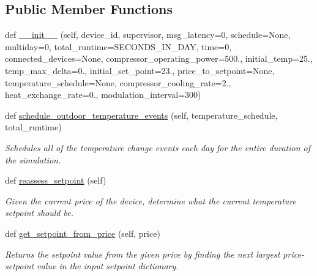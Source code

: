 \subsection*{Public Member Functions}
\begin{DoxyCompactItemize}
\item 
def \hyperlink{class_build_1_1_objects_1_1air__conditioner_1_1_air_conditioner_simple_a851cc811958a860f2796cbb5af4f40da}{\+\_\+\+\_\+init\+\_\+\+\_\+} (self, device\+\_\+id, supervisor, msg\+\_\+latency=0, schedule=None, multiday=0, total\+\_\+runtime=S\+E\+C\+O\+N\+D\+S\+\_\+\+I\+N\+\_\+\+D\+AY, time=0, connected\+\_\+devices=None, compressor\+\_\+operating\+\_\+power=500., initial\+\_\+temp=25., temp\+\_\+max\+\_\+delta=0., initial\+\_\+set\+\_\+point=23., price\+\_\+to\+\_\+setpoint=None, temperature\+\_\+schedule=None, compressor\+\_\+cooling\+\_\+rate=2., heat\+\_\+exchange\+\_\+rate=0., modulation\+\_\+interval=300)
\item 
def \hyperlink{class_build_1_1_objects_1_1air__conditioner_1_1_air_conditioner_simple_a780672ba57c94495b1203d5da8715ec8}{schedule\+\_\+outdoor\+\_\+temperature\+\_\+events} (self, temperature\+\_\+schedule, total\+\_\+runtime)
\begin{DoxyCompactList}\small\item\em Schedules all of the temperature change events each day for the entire duration of the simulation. \end{DoxyCompactList}\item 
def \hyperlink{class_build_1_1_objects_1_1air__conditioner_1_1_air_conditioner_simple_ace754a3c9581817b5bbce2394da2163a}{reassess\+\_\+setpoint} (self)
\begin{DoxyCompactList}\small\item\em Given the current price of the device, determine what the current temperature setpoint should be. \end{DoxyCompactList}\item 
def \hyperlink{class_build_1_1_objects_1_1air__conditioner_1_1_air_conditioner_simple_ac637b8d11556eea36880d3947b5c00c0}{get\+\_\+setpoint\+\_\+from\+\_\+price} (self, price)
\begin{DoxyCompactList}\small\item\em Returns the setpoint value from the given price by finding the next largest price-\/setpoint value in the input setpoint dictionary. \end{DoxyCompactList}\item 
\mbox{\label{class_build_1_1_objects_1_1air__conditioner_1_1_air_conditioner_simple_a641bfc9644a25a253f17c0e508ffa1ae}} 

\end{DoxyCompactItemize}
